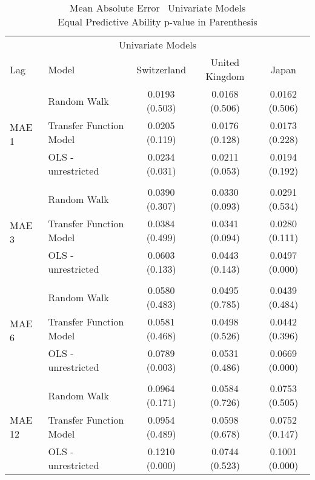 \begin{table}[!ht] %
  \centering
  \caption[MAE \textendash \ Univariate Models]{Mean Absolute Error \textendash \ Univariate Models \\
           Equal Predictive Ability p-value in Parenthesis}
  \begin{tabular}{llccc} %
    \toprule
    \multicolumn{5}{c}{Univariate Models}                      \\
    \cmidrule(r){1-5}
    Lag                           &   Model                                     &Switzerland  & United Kingdom  & Japan\\
    \midrule
    \multirow{4}{*}{MAE 1}        & \multicolumn{1}{l}{Random Walk}             &   0.0193 (0.503) & 0.0168 (0.506) & 0.0162 (0.506)\\
                                  & \multicolumn{1}{l}{Transfer Function Model} &   0.0205 (0.119) & 0.0176 (0.128) & 0.0173 (0.228)\\ 
                                  & \multicolumn{1}{l}{OLS - unrestricted}      &   0.0234 (0.031) & 0.0211 (0.053) & 0.0194 (0.192)\\
    \\
    \multirow{4}{*}{MAE 3}        & \multicolumn{1}{l}{Random Walk}             &   0.0390 (0.307) & 0.0330 (0.093) & 0.0291 (0.534)\\ 
                                  & \multicolumn{1}{l}{Transfer Function Model} &   0.0384 (0.499) & 0.0341 (0.094) & 0.0280 (0.111)\\
                                  & \multicolumn{1}{l}{OLS - unrestricted}      &   0.0603 (0.133) & 0.0443 (0.143) & 0.0497 (0.000)\\
    \\
    \multirow{4}{*}{MAE 6}        & \multicolumn{1}{l}{Random Walk}             &   0.0580 (0.483) & 0.0495 (0.785) & 0.0439 (0.484)\\
                                  & \multicolumn{1}{l}{Transfer Function Model} &   0.0581 (0.468) & 0.0498 (0.526) & 0.0442 (0.396)\\
                                  & \multicolumn{1}{l}{OLS - unrestricted}      &   0.0789 (0.003) & 0.0531 (0.486) & 0.0669 (0.000)\\
     \\
    \multirow{4}{*}{MAE 12}       & \multicolumn{1}{l}{Random Walk}             &   0.0964 (0.171) & 0.0584 (0.726) & 0.0753 (0.505)\\
                                  & \multicolumn{1}{l}{Transfer Function Model} &   0.0954 (0.489) & 0.0598 (0.678) & 0.0752 (0.147)\\
                                  & \multicolumn{1}{l}{OLS - unrestricted}      &   0.1210 (0.000) & 0.0744 (0.523) & 0.1001 (0.000)\\
    \bottomrule
  \end{tabular}
  \label{table:MAEunivariate}
  \vspace{2em}
\end{table}

